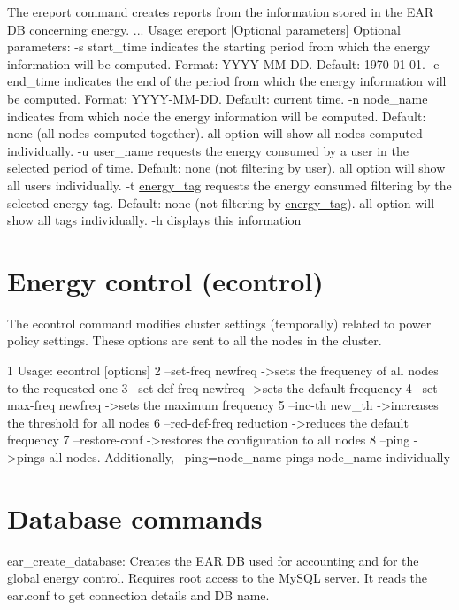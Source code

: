 The ereport command creates reports from the information stored in the E\+AR DB concerning energy. ... Usage\+: ereport \mbox{[}Optional parameters\mbox{]} Optional parameters\+: -\/s start\+\_\+time indicates the starting period from which the energy information will be computed. Format\+: Y\+Y\+Y\+Y-\/\+M\+M-\/\+DD. Default\+: 1970-\/01-\/01. -\/e end\+\_\+time indicates the end of the period from which the energy information will be computed. Format\+: Y\+Y\+Y\+Y-\/\+M\+M-\/\+DD. Default\+: current time. -\/n node\+\_\+name indicates from which node the energy information will be computed. Default\+: none (all nodes computed together). \textquotesingle{}all\textquotesingle{} option will show all nodes computed individually. -\/u user\+\_\+name requests the energy consumed by a user in the selected period of time. Default\+: none (not filtering by user). \textquotesingle{}all\textquotesingle{} option will show all users individually. -\/t \hyperlink{structenergy__tag}{energy\+\_\+tag} requests the energy consumed filtering by the selected energy tag. Default\+: none (not filtering by \hyperlink{structenergy__tag}{energy\+\_\+tag}). \textquotesingle{}all\textquotesingle{} option will show all tags individually. -\/h displays this information

\section*{Energy control (econtrol)}

The econtrol command modifies cluster settings (temporally) related to power policy settings. These options are sent to all the nodes in the cluster.


\begin{DoxyCode}
1 Usage: econtrol [options]
2     --set-freq  newfreq         ->sets the frequency of all nodes to the requested one
3     --set-def-freq  newfreq     ->sets the default frequency
4     --set-max-freq  newfreq     ->sets the maximum frequency
5     --inc-th    new\_th          ->increases the threshold for all nodes
6     --red-def-freq  reduction   ->reduces the default frequency
7     --restore-conf              ->restores the configuration to all nodes
8     --ping                      ->pings all nodes. Additionally, --ping=node\_name pings node\_name
       individually
\end{DoxyCode}


\section*{Database commands}


\begin{DoxyItemize}
\item ear\+\_\+create\+\_\+database\+: Creates the E\+AR DB used for accounting and for the global energy control. Requires root access to the My\+S\+QL server. It reads the ear.\+conf to get connection details and DB name. 
\end{DoxyItemize}